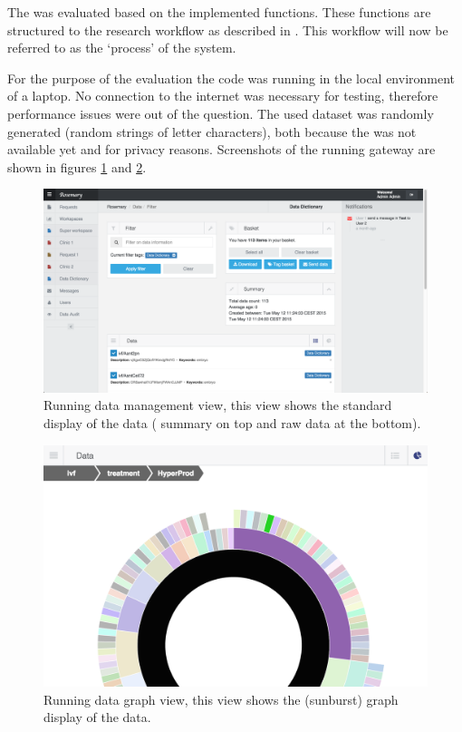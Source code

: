 The \ivfsystem{} was evaluated based on the implemented functions.
These functions are structured to the research workflow as described in . This workflow will now be referred to as the `process' of the system.

For the purpose of the evaluation the \ivfsystem{} code was running in the local environment of a laptop.
No connection to the internet was necessary for testing, therefore performance issues were out of the question.
The used dataset was randomly generated (random strings of letter characters), both because the \projectdata{} was not available yet and for privacy reasons.
Screenshots of the running gateway are shown in figures \ref{fig:standard-view-website} and \ref{fig:sunburst-view-zoom-website}.

\begin{figure}[!b]
	\centering
	\includegraphics[width=1.0\linewidth]{images/standard-view}
	\caption{
		Running \ivfsystem{} data management view, this view shows the standard display of the data (\ie{} summary on top and raw data at the bottom).
	}
	\label{fig:standard-view-website}
\end{figure}

\begin{figure}[ht]
	\centering
	\includegraphics[width=0.7\linewidth]{images/sunburst-closeup}
	\caption{
		Running \ivfsystem{} data graph view, this view shows the (sunburst) graph display of the data.
	}
	\label{fig:sunburst-view-zoom-website}
\end{figure}

